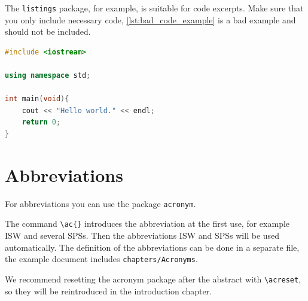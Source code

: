 The \texttt{listings} package, for example, is suitable for code excerpts. 
Make sure that you only include necessary code, \autoref{lst:bad_code_example} is a bad example and should not be included.

\begin{lstlisting}[language=C++, caption={This code does not provide any insights and should not be included.}, label={lst:bad_code_example}]
#include <iostream>

using namespace std;

int main(void){
    cout << "Hello world." << endl;
    return 0;
}
\end{lstlisting}

\section{Abbreviations}

For abbreviations you can use the package \texttt{acronym}.

The command \texttt{\textbackslash ac\{\}} introduces the abbreviation at the first use, for example \ac{ISW} and several \acp{SPS}. Then the abbreviations \ac{ISW} and \acp{SPS} will be used automatically. The definition of the abbreviations can be done in a separate file, the example document includes \texttt{chapters/Acronyms}.

We recommend resetting the acronym package after the abstract with \texttt{\textbackslash acreset}, so they will be reintroduced in the introduction chapter.



\nocite{*}
